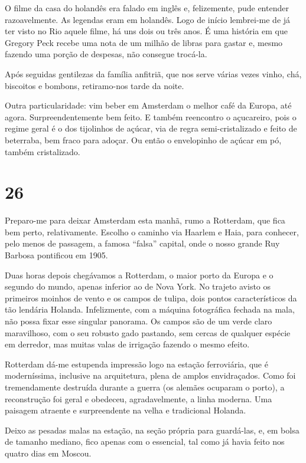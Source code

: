 O filme da casa do holandês era falado em inglês e, felizemente, pude entender razoavelmente. As legendas eram em holandês. Logo de início lembrei-me de já ter visto no Rio aquele filme, há uns dois ou três anos. É uma história em que Gregory Peck recebe uma nota de um milhão de libras para gastar e, mesmo fazendo uma porção de despesas, não consegue trocá-la.

Após seguidas gentilezas da família anfitriã, que nos serve várias vezes vinho, chá, biscoitos e bombons, retiramo-nos tarde da noite.

Outra particularidade: vim beber em Amsterdam o melhor café da Europa, até agora. Surpreendentemente bem feito. E também reencontro o açucareiro, pois o regime geral é o dos tijolinhos de açúcar, via de regra semi-cristalizado e feito de beterraba, bem fraco para adoçar. Ou então o envelopinho de açúcar em pó, também cristalizado.

\section*{26 \adfflatleafright {}}
Preparo-me para deixar Amsterdam esta manhã, rumo a Rotterdam, que fica bem perto, relativamente. Escolho o caminho via Haarlem e Haia, para conhecer, pelo menos de passagem, a famosa “falsa” capital, onde o nosso grande Ruy Barbosa pontificou em 1905.

Duas horas depois chegávamos a Rotterdam, o maior porto da Europa e o segundo do mundo, apenas inferior ao de Nova York. No trajeto avisto os primeiros moinhos de vento e os campos de tulipa, dois pontos característicos da tão lendária Holanda. Infelizmente, com a máquina fotográfica fechada na mala, não possa fixar esse singular panorama. Os campos são de um verde claro maravilhoso, com o seu robusto gado pastando, sem cercas de qualquer espécie em derredor, mas muitas valas de irrigação fazendo o mesmo efeito.

Rotterdam dá-me estupenda impressão logo na estação ferroviária, que é moderníssima, inclusive na arquitetura, plena de amplos envidraçados. Como foi tremendamente destruída durante a guerra (os alemães ocuparam o porto), a reconstrução foi geral e obedeceu, agradavelmente, a linha moderna. Uma paisagem atraente e surpreendente na velha e tradicional Holanda.

Deixo as pesadas malas na estação, na seção própria para guardá-las, e, em bolsa de tamanho mediano, fico apenas com o essencial, tal como já havia feito nos quatro dias em Moscou.

